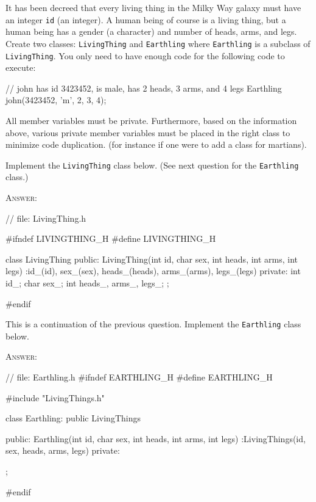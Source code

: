 \newpage
\nextq
It has been decreed that every living thing in the Milky Way galaxy must have
an integer \verb!id! (an integer).
A human being of course is a living thing,
but a human being has a gender (a character) and number of heads, arms, and
legs.
Create two classes: \verb!LivingThing! and \verb!Earthling! where
\verb!Earthling! is a subclass of \verb!LivingThing!.
You only need to have enough code for the following code to execute:
\begin{console}[fontsize=\small]
// john has id 3423452, is male, has 2 heads, 3 arms, and 4 legs
Earthling john(3423452, 'm', 2, 3, 4);
\end{console}
All member variables must be private.
Furthermore, based on the information above, various private member variables
must be placed in the right class to minimize code duplication.
(for instance if one were to add a class for martians).

Implement the \verb!LivingThing! class below.
(See next question for the \verb!Earthling! class.)

\textsc{Answer:}
\begin{answercode}
// file: LivingThing.h

#ifndef LIVINGTHING_H
#define LIVINGTHING_H

class LivingThing
{
public:
    LivingThing(int id, char sex, int heads, int arms, int legs)
        :id_(id), sex_(sex), heads_(heads), arms_(arms), legs_(legs)
    {}
private:
    int id_;
    char sex_;
    int heads_, arms_, legs_;
};

#endif
\end{answercode}


\newpage
\nextq
This is a continuation of the previous question.
Implement the \verb!Earthling! class below.

\textsc{Answer:}
\begin{answercode}

// file: Earthling.h
#ifndef EARTHLING_H
#define EARTHLING_H

#include "LivingThings.h"

class Earthling: public LivingThings
{
public:
    Earthling(int id, char sex, int heads, int arms, int legs)
        :LivingThings(id, sex, heads, arms, legs)
    {}
private:
    
};

#endif
\end{answercode}


